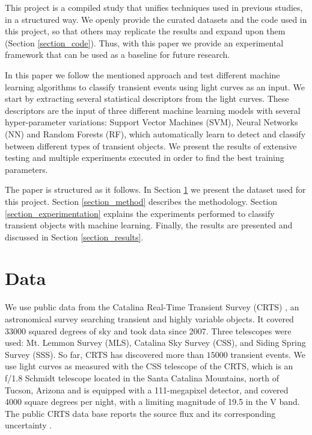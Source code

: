 \documentclass[a4paper,fleqn,usenatbib]{mnras}
\begin{document}
This project is a compiled study that unifies techniques used in previous studies, in a structured way. We openly provide the curated datasets and the code used in this project, so that others may replicate the results and expand upon them (Section \ref{section_code}). Thus, with this paper we provide an experimental framework that can be used as a baseline for future research.

In this paper we follow the mentioned approach and test 
different machine
learning algorithms to classify transient events using light curves as an input.  
We start by extracting several statistical descriptors from the light
curves.
These descriptors are the input of three different machine learning
models with several hyper-parameter variations: Support Vector
Machines (SVM), Neural Networks (NN) and Random Forests (RF), which automatically
learn to detect and classify between different types of transient
objects. 
We present the results of extensive testing and multiple experiments
executed in order to find the best training parameters. 



The paper is structured as it follows. In Section \ref{section_data}
we present the dataset used for this project. 
Section \ref{section_method} describes the methodology.
Section \ref{section_experimentation} explains the experiments
performed to classify transient objects with machine
learning. 
Finally, the results are presented and discussed in
Section \ref{section_results}.  

\section{Data} \label{section_data}

We use public data from the Catalina Real-Time Transient Survey
(CRTS) \citep{1111.2566}, an astronomical survey searching transient
and highly variable objects.   
It covered 33000 squared degrees of sky and took data since 2007.
Three telescopes were used: Mt. Lemmon Survey (MLS), Catalina Sky
Survey (CSS), and Siding Spring Survey (SSS). So far, CRTS has
discovered more than $15000$ transient events.
We use light curves as measured with the CSS telescope of the CRTS, which is
an f/1.8 Schmidt telescope located in the Santa Catalina Mountains, north of Tucson,
Arizona and is equipped with a 111-megapixel  detector, and covered
4000 square degrees per night, with a limiting magnitude of 19.5 in
the V band.  
The public CRTS data base reports the source flux and its
corresponding uncertainty \citep{1996PASP..108..851S}.
\end{document}
